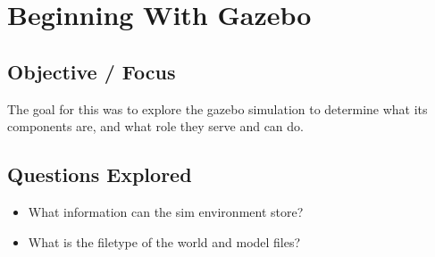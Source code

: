 \section{Beginning With Gazebo}

\subsection{Objective / Focus}
The goal for this was to explore the gazebo simulation to determine what its components are, and what role they serve and can do.

\subsection{Questions Explored}
\begin{itemize}
    \item What information can the sim environment store?
    \item What is the filetype of the world and model files?
\end{itemize}

